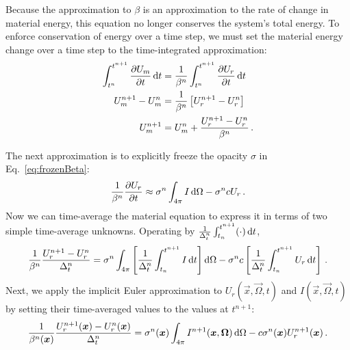 Because the approximation to $\beta$ is an approximation to the rate of change
in material energy, this equation no longer conserves the system's total
energy. To enforce conservation of energy over a time step, we must set the
material energy change over a time step to the time-integrated approximation:
\begin{align}
  \nonumber
  \int_{t^n}^{t^{n+1}}  \frac{\partial U_m}{\partial t}\mathop{}\!\mathrm{d} t &= \frac{1}{\beta^n}
  \int_{t^n}^{t^{n+1}} \frac{\partial U_r}{\partial t}\mathop{}\!\mathrm{d} t
  \\
  \nonumber
  U_m^{n+1} - U_m^n &= \frac{1}{\beta^n} \left[ U_r^{n+1} - U_r^n \right]
  \\
  \label{eq:matenConservationUpdate}
  U_m^{n+1} &=  U_m^n + \frac{U_r^{n+1} - U_r^n}{\beta^n}\,.
\end{align}

The next approximation is to explicitly freeze the opacity $\sigma$ in
Eq.~\eqref{eq:frozenBeta}:
\begin{equation*}
  \frac{1}{\beta^n}
  \frac{\partial U_r}{\partial t} \approx \sigma^n \int_{4\pi}  I \mathop{}\!\mathrm{d} \Omega - \sigma^n c U_r \,.
\end{equation*}
Now we can time-average the material equation to express it in terms of two
simple time-average unknowns. Operating by
$\frac{1}{\Delta_t^n}\int_{t_n}^{t^{n+1}} (\cdot) \mathop{}\!\mathrm{d} t$,
\begin{equation*}
  \frac{1}{\beta^n}
  \frac{U_r^{n+1} - U_r^n}{\Delta_t^n} = \sigma^n \int_{4\pi} \left[
  \frac{1}{\Delta_t^n}\int_{t_n}^{t^{n+1}} I\mathop{}\!\mathrm{d} t
  \right] \mathop{}\!\mathrm{d} \Omega - \sigma^n c \left[
  \frac{1}{\Delta_t^n}\int_{t_n}^{t^{n+1}} U_r \mathop{}\!\mathrm{d} t \right]\,.
\end{equation*}
Next, we apply the implicit Euler approximation to $U_r(\vec{x}, \vec{\Omega},
t)$ and $I(\vec{x}, \vec{\Omega}, t)$ by setting their time-averaged values to
the values at $t^{n+1}$:
\begin{equation} \label{eq:semiImplicitMaterial}
  \frac{1}{\beta^n(\bm{x})}
  \frac{U_r^{n+1}(\bm{x}) - U_r^n(\bm{x})}{\Delta_t^n}
  = \sigma^n(\bm{x}) \int_{4\pi} I^{n+1}(\bm{x}, \bm{\Omega})\mathop{}\!\mathrm{d} \Omega
  - c \sigma^n(\bm{x}) U_r^{n+1}(\bm{x}) \,.
\end{equation}

